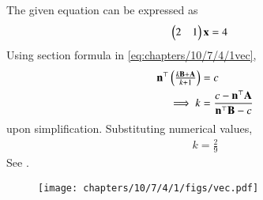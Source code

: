 The given equation can be expressed as
\begin{align}
\label{eq:chapters/10/7/4/1vec}
    \begin{pmatrix}2&1\end{pmatrix}\mathbf{x}&=4
\end{align}
Using section formula in
\eqref{eq:chapters/10/7/4/1vec},
\begin{align}
    \mathbf{n}^{\top}\begin{pmatrix}\frac{k\mathbf{B+A}}{k+1}\end{pmatrix}&=c\\
    \implies k&=\frac{c-\mathbf{n}^{\top}\mathbf{A}}{\mathbf{n}^{\top}\mathbf{B}-c}
\end{align}
upon simplification.  Substituting numerical values, 
\begin{align}
    k=\frac{2}{9}
\end{align}
See 
.
\begin{figure}[H]
\centering
\texttt{[image: chapters/10/7/4/1/figs/vec.pdf]}
\caption{}
\label{fig:chapters/10/7/4/1vec}
\end{figure}

